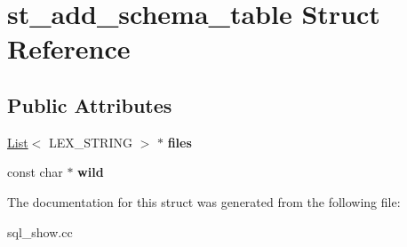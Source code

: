 \hypertarget{structst__add__schema__table}{}\section{st\+\_\+add\+\_\+schema\+\_\+table Struct Reference}
\label{structst__add__schema__table}
\subsection*{Public Attributes}
\begin{DoxyCompactItemize}
\item 
\mbox{\label{structst__add__schema__table_ab4fd41aadf9395fa4aeb744fffd38d06}} 
\mbox{\hyperlink{classList}{List}}$<$ L\+E\+X\+\_\+\+S\+T\+R\+I\+NG $>$ $\ast$ {\bfseries files}
\item 
\mbox{\label{structst__add__schema__table_a798b1b5eca0c938c73811c3f7907d01e}} 
const char $\ast$ {\bfseries wild}
\end{DoxyCompactItemize}


The documentation for this struct was generated from the following file\+:\begin{DoxyCompactItemize}
\item 
sql\+\_\+show.\+cc\end{DoxyCompactItemize}
